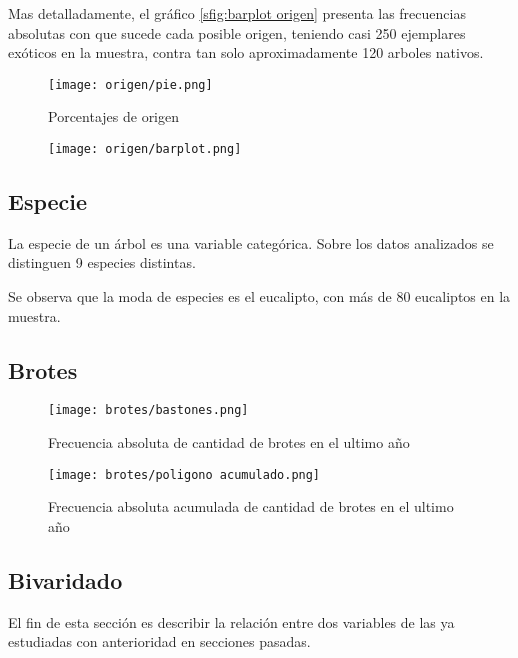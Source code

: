 \documentclass[a4paper]{article}
\begin{document}
Mas detalladamente, el gráfico \ref{sfig:barplot origen} presenta las frecuencias absolutas con
que sucede cada posible origen, teniendo casi 250 ejemplares exóticos en la muestra, contra tan
solo aproximadamente 120 arboles nativos.

\begin{figure}
    \centering
    \caption{Porcentajes de origen}
    \texttt{[image: origen/pie.png]}
    \label{sfig:pie origen}
\end{figure}
\begin{figure}[H]
    \centering
    \texttt{[image: origen/barplot.png]}
    \label{fig:barplot especie}
\end{figure}

\subsection{Especie}
La especie de un árbol es una variable categórica. Sobre los datos analizados se distinguen
9 especies distintas.

Se observa que la moda de especies es el eucalipto, con más de 80 eucaliptos en la muestra.

\subsection{Brotes}
\begin{figure}[H]
    \centering
    \texttt{[image: brotes/bastones.png]}
    \caption{Frecuencia absoluta de cantidad de brotes en el ultimo año}
    \label{fig:bastones brotes}
\end{figure}
\begin{figure}[H]
    \centering
    \texttt{[image: brotes/poligono acumulado.png]}
    \caption{Frecuencia absoluta acumulada de cantidad de brotes en el ultimo año}
    \label{fig:poligono acumulado brotes}
\end{figure}

\subsection{Bivaridado}
El fin de esta sección es describir la relación entre dos variables de las ya estudiadas
con anterioridad en secciones pasadas.
\end{document}
